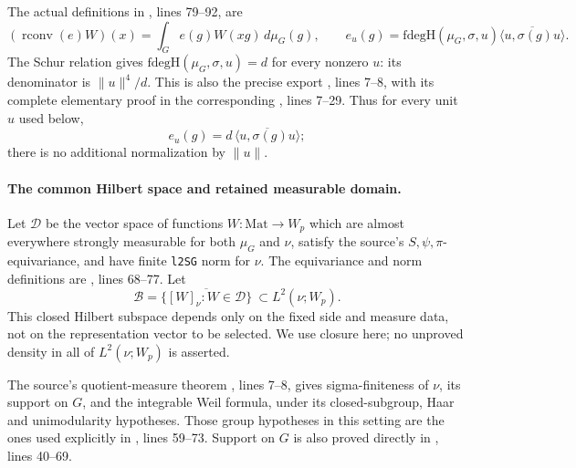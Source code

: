 \documentclass[11pt,a4paper]{article}
\begin{document}
The actual definitions in
, lines 79--92,
are
\[
 (\operatorname{rconv}(e)W)(x)
 =\int_G e(g)W(xg)\,d\mu_G(g),\qquad
 e_u(g)=\mathrm{fdegH}(\mu_G,\sigma,u)
             \overline{\langle u,\sigma(g)u\rangle}.
\]
The Schur relation gives
\(\mathrm{fdegH}(\mu_G,\sigma,u)=d\) for every nonzero \(u\):
its denominator is \(\|u\|^4/d\).
This is also the precise export
,
lines 7--8, with its complete elementary proof in the corresponding
, lines 7--29.
Thus for every unit \(u\) used below,
\[
 e_u(g)=d\,\overline{\langle u,\sigma(g)u\rangle};
\]
there is no additional normalization by \(\|u\|\).

\paragraph{The common Hilbert space and retained measurable domain.}
Let \(\mathcal D\) be the vector space of functions
\(W:\mathrm{Mat}\to W_p\) which are almost everywhere strongly
measurable for both \(\mu_G\) and \(\nu\), satisfy the source's
\(S,\psi,\pi\)-equivariance, and have finite \texttt{l2SG} norm
for \(\nu\). The equivariance and norm definitions are
, lines 68--77.
Let
\[
 \mathcal B=\overline{\{[W]_\nu:W\in\mathcal D\}}
       \ \subset L^2(\nu;W_p).
\]
This closed Hilbert subspace depends only on the fixed side and
measure data, not on the representation vector to be selected.
We use closure here; no unproved density in all of \(L^2(\nu;W_p)\)
is asserted.

The source's quotient-measure theorem
,
lines 7--8, gives sigma-finiteness of \(\nu\), its support on \(G\),
and the integrable Weil formula, under its closed-subgroup,
Haar and unimodularity hypotheses. Those group hypotheses in
this setting are the ones used explicitly in
, lines 59--73.
Support on \(G\) is also proved directly in
, lines 40--69.
\end{document}
